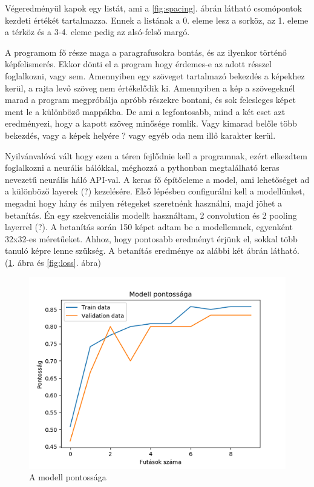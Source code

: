 Végeredményül kapok egy listát, ami a \ref{fig:spacing}. ábrán látható csomópontok kezdeti értékét tartalmazza. Ennek a listának a 0. eleme lesz a sorköz, az 1. eleme a térköz és a 3-4. eleme pedig az alsó-felső margó.


A programom fő része maga a paragrafusokra bontás, és az ilyenkor történő képfelismerés. Ekkor dönti el a program hogy érdemes-e az adott résszel foglalkozni, vagy sem. Amennyiben egy szöveget tartalmazó bekezdés a képekhez kerül, a rajta levő szöveg nem értékelődik ki. Amennyiben a kép a szövegeknél marad a program megpróbálja apróbb részekre bontani, és sok felesleges képet ment le a különböző mappákba. De ami a legfontosabb, mind a két eset azt eredményezi, hogy a kapott szöveg minősége romlik. Vagy kimarad belőle több bekezdés, vagy a képek helyére ? vagy egyéb oda nem illő karakter kerül.

Nyilvánvalóvá vált hogy ezen a téren fejlődnie kell a programnak, ezért elkezdtem foglalkozni a neurális hálókkal, méghozzá a pythonban megtalálható keras nevezetű neurális háló API-val. A keras fő építőeleme a model, ami lehetőséget ad a különböző layerek (?) kezelésére. Első lépésben configurálni kell a modellünket, megadni hogy hány és milyen rétegeket szeretnénk használni, majd jöhet a betanítás. Én egy szekvenciális modellt használtam, 2 convolution és 2 pooling layerrel (?). A betanítás során 150 képet adtam be a modellemnek, egyenként 32x32-es méretűeket. Ahhoz, hogy pontosabb eredményt érjünk el, sokkal több tanuló képre lenne szükség. A betanítás eredménye az alábbi két ábrán látható. (\ref{fig:accuracy}. ábra és \ref{fig:loss}. ábra)

\begin{figure}[H]
\centering
\includegraphics[scale=1]{images/accuracy.png}
\caption{A modell pontossága}
\label{fig:accuracy}
\end{figure}

